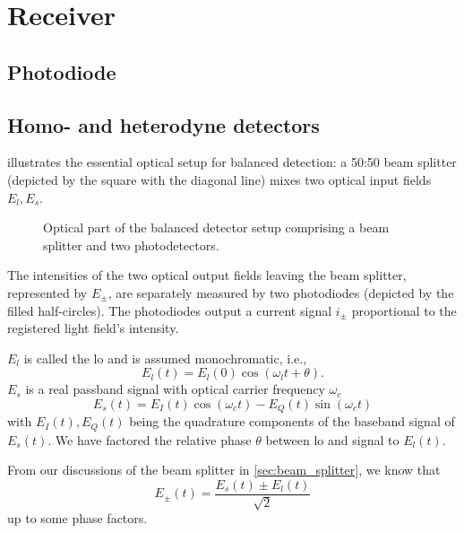\section{Receiver}

\cite{Bruschi2013} %

\subsection{Photodiode}

\subsection{Homo- and heterodyne detectors}

 illustrates the essential optical setup for balanced detection:
a 50:50 beam splitter (depicted by the square with the diagonal line) mixes two optical input fields $E_l,E_s$.
\begin{figure}[htb]
    \centering
    
    \caption{Optical part of the balanced detector setup comprising a beam splitter and two photodetectors.}\label{fig:balanced_detector_optics}
\end{figure}
The intensities of the two optical output fields leaving the beam splitter, represented by $E_\pm$, are separately measured by two photodiodes (depicted by the filled half-circles).
The photodiodes output a current signal $i_\pm$ proportional to the registered light field's intensity.

$E_l$ is called the \gls{lo} and is assumed monochromatic, i.e.,
\begin{equation}
    E_l(t)
    =
    E_l(0)\cos(\omega_l t+\theta)
    \label{eq:efield_lo}.
\end{equation}
$E_s$ is a real passband signal with optical carrier frequency $\omega_c$
\begin{equation}
    E_s(t)
    =
    E_I(t)\cos(\omega_c t)-E_Q(t)\sin(\omega_c t)
    \label{eq:efield_signal}
\end{equation}
with $E_I(t),E_Q(t)$ being the quadrature components of the baseband signal of $E_s(t)$.
We have factored the relative phase $\theta$ between \gls{lo} and signal to $E_l(t)$.

From our discussions of the beam splitter in \cref{sec:beam_splitter}, we know that
\begin{equation}
    E_\pm(t)
    =
    \frac{E_s(t)\pm E_l(t)}{\sqrt{2}}
\end{equation}
up to some phase factors.

